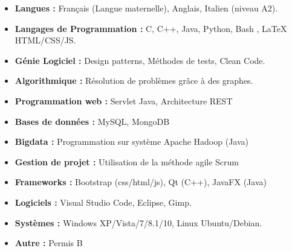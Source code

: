 \documentclass[11pt,a4paper,sans]{moderncv}
\begin{document}
\begin{itemize}
	\item \textbf{Langues :} Français (Langue maternelle), Anglais, Italien (niveau A2).
	\vspace{4pt}

	\item \textbf{Langages de Programmation :} C, C++, Java, Python, Bash , LaTeX HTML/CSS/JS.
	\vspace{4pt}

    \item \textbf{Génie Logiciel :} Design patterns, Méthodes de tests, Clean Code.
    \vspace{4pt}

	\item \textbf{Algorithmique :} Résolution de problèmes grâce à des graphes. \vspace{4pt}

	\item \textbf{Programmation web :} Servlet Java, Architecture REST
    \vspace{4pt}

    \item \textbf{Bases de données :} MySQL, MongoDB
    \vspace{4pt}

    \item \textbf{Bigdata :} Programmation sur système Apache Hadoop (Java)
    \vspace{4pt}

   	\item \textbf{Gestion de projet :} Utilisation de la méthode agile Scrum
   	\vspace{4pt}

	\item \textbf{Frameworks :} Bootstrap (css/html/js), Qt (C++), JavaFX (Java)
	\vspace{4pt}

	\item \textbf{Logiciels :} Visual Studio Code, Eclipse, Gimp.
    \vspace{4pt}

	\item \textbf{Systèmes :} Windows XP/Vista/7/8.1/10, Linux Ubuntu/Debian.
    \vspace{4pt}

	\item \textbf{Autre :} Permis B

\end{itemize}
\end{document}
